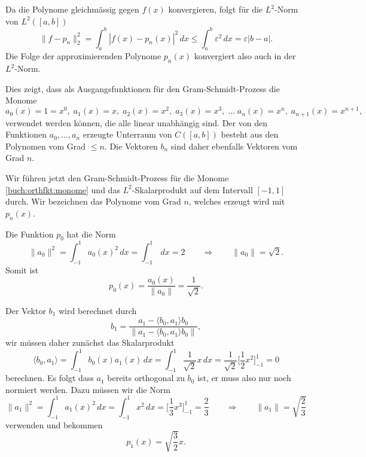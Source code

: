 Da die Polynome gleichmässig gegen $f(x)$ konvergieren, folgt für die
$L^2$-Norm von $L^2([a,b])$
\[
\| f-p_n \|_2^2
=
\int_a^b |f(x)-p_n(x)|^2\,dx
\le 
\int_a^b \varepsilon^2 \,dx
=
\varepsilon |b-a|.
\]
Die Folge der approximierenden Polynome $p_n(x)$ konvergiert also
auch in der $L^2$-Norm.

Dies zeigt, dass als Ausgangsfunktionen für den Gram-Schmidt-Prozess
die Monome
\begin{equation}
a_0(x)=1=x^0,\;
a_1(x)=x,\;
a_2(x)=x^2,\;
a_3(x)=x^3,\;
\ldots\;
a_n(x)=x^n,\;
a_{n+1}(x)=x^{n+1},\;
\label{buch:orthfkt:monome}
\end{equation}
verwendet werden können, die alle linear unabhängig sind.
Der von den Funktionen $a_0,\dots,a_n$ erzeugte Unterraum von
$C([a,b])$ besteht aus den Polynomen vom Grad $\le n$.
Die Vektoren $b_n$ sind daher ebenfalls Vektoren vom Grad $n$.

Wir führen jetzt den Gram-Schmidt-Prozess für die Monome
\eqref{buch:orthfkt:monome}
und das $L^2$-Skalarprodukt auf dem Intervall $[-1,1]$ durch.
Wir bezeichnen das Polynome vom Grad $n$, welches erzeugt wird mit $p_n(x)$.

Die Funktion $p_0$ hat die Norm
\[
\|a_0\|^2
=
\int_{-1}^1 a_0(x)^2\,dx
=
\int_{-1}^1 \,dx
=
2
\qquad\Rightarrow\qquad
\|a_0\| = \sqrt{2}.
\]
Somit ist
\[
p_0(x) = \frac{a_0(x)}{\|a_0\|} = \frac{1}{\sqrt{2}}.
\]

Der Vektor $b_1$ wird berechnet durch
\[
b_1
=
\frac{
a_1-\langle b_0,a_1\rangle b_0
}{
\|
a_1-\langle b_0,a_1\rangle b_0
\|
},
\]
wir müssen daher zunächst das Skalarprodukt
\[
\langle b_0,a_1\rangle
=
\int_{-1}^1 b_0(x)a_1(x)\,dx
=
\int_{-1}^1 \frac{1}{\sqrt{2}} x\,dx
=
\frac{1}{\sqrt{2}} \biggl[\frac12x^2\biggr]_{-1}^1=0
\]
berechnen.
Es folgt dass $a_1$ bereits orthogonal zu $b_0$ ist, er muss also
nur noch normiert werden.
Dazu müssen wir die Norm
\[
\| a_1\|^2
=
\int_{-1}^1 a_1(x)^2\,dx
=
\int_{-1}^1 x^2\,dx
=
\biggl[\frac13x^3\biggr]_{-1}^1
=
\frac{2}{3}
\qquad\Rightarrow\qquad
\|a_1\|
=
\sqrt{\frac{2}{3}}
\]
verwenden und bekommen
\[
p_1(x) = \sqrt{\frac{3}{2}} x.
\]

